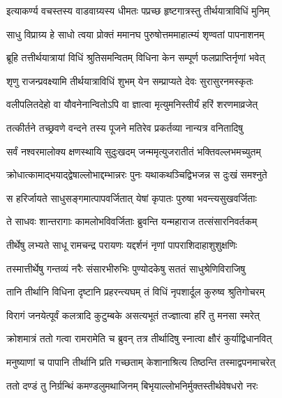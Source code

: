 \twolineshloka
{इत्याकर्ण्य वचस्तस्य वाडवाग्र्यस्य धीमतः}
{पप्रच्छ हृष्टगात्रस्तु तीर्थयात्राविधिं मुनिम्}%


\twolineshloka
{साधु विप्राग्र्य हे साधो त्वया प्रोक्तं ममानघ}
{पुरुषोत्तममाहात्म्यं शृण्वतां पापनाशनम्}%

\twolineshloka
{ब्रूहि तत्तीर्थयात्रायां विधिं श्रुतिसमन्वितम्}
{विधिना केन सम्पूर्ण फलप्राप्तिर्नृणां भवेत्}%


\twolineshloka
{शृणु राजन्प्रवक्ष्यामि तीर्थयात्राविधिं शुभम्}
{येन सम्प्राप्यते देवः सुरासुरनमस्कृतः}%

\twolineshloka
{वलीपलितदेहो वा यौवनेनान्वितोऽपि वा}
{ज्ञात्वा मृत्युमनिस्तीर्यं हरिं शरणमाव्रजेत्}%

\twolineshloka
{तत्कीर्तने तच्छ्रवणे वन्दने तस्य पूजने}
{मतिरेव प्रकर्तव्या नान्यत्र वनितादिषु}%

\twolineshloka
{सर्वं नश्वरमालोक्य क्षणस्थायि सुदुःखदम्}
{जन्ममृत्युजरातीतं भक्तिवल्लभमच्युतम्}%

\twolineshloka
{क्रोधात्कामाद्भयाद्द्वेषाल्लोभाद्दम्भान्नरः पुनः}
{यथाकथञ्चिद्विभजन्न स दुःखं समश्नुते}%

\twolineshloka
{स हरिर्जायते साधुसङ्गमात्पापवर्जितात्}
{येषां कृपातः पुरुषा भवन्त्यसुखवर्जिताः}%

\twolineshloka
{ते साधवः शान्तरागाः कामलोभविवर्जिताः}
{ब्रुवन्ति यन्महाराज तत्संसारनिवर्तकम्}%

\twolineshloka
{तीर्थेषु लभ्यते साधू रामचन्द्र परायणः}
{यद्दर्शनं नृणां पापराशिदाहाशुशुक्षणिः}%

\twolineshloka
{तस्मात्तीर्थेषु गन्तव्यं नरैः संसारभीरुभिः}
{पुण्योदकेषु सततं साधुश्रेणिविराजिषु}%

\twolineshloka
{तानि तीर्थानि विधिना दृष्टानि प्रहरन्त्यघम्}
{तं विधिं नृपशार्दूल कुरुष्व श्रुतिगोचरम्}%

\twolineshloka
{विरागं जनयेत्पूर्वं कलत्रादि कुटुम्बके}
{असत्यभूतं तज्ज्ञात्वा हरिं तु मनसा स्मरेत्}%

\twolineshloka
{क्रोशमात्रं ततो गत्वा रामरामेति च ब्रुवन्}
{तत्र तीर्थादिषु स्नात्वा क्षौरं कुर्याद्विधानवित्}%

\twolineshloka
{मनुष्याणां च पापानि तीर्थानि प्रति गच्छताम्}
{केशानाश्रित्य तिष्ठन्ति तस्माद्वपनमाचरेत्}%

\twolineshloka
{ततो दण्डं तु निर्ग्रन्थिं कमण्डलुमथाजिनम्}
{बिभृयाल्लोभनिर्मुक्तस्तीर्थवेषधरो नरः}%


